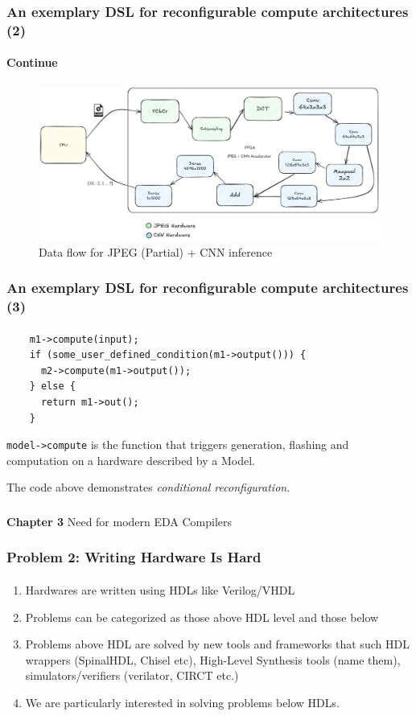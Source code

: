 \documentclass{beamer}
\begin{document}
{\begin{frame}[fragile]
  \frametitle{An exemplary DSL for reconfigurable compute architectures (2)}
\framesubtitle{Continue}
   \begin{figure}
        \centering
        \includegraphics[width=1\linewidth]{flowcnnjpeg.png}
        \caption{Data flow for JPEG (Partial) + CNN inference}
    \end{figure}
\end{frame}

\begin{frame}[fragile]
  \frametitle{An exemplary DSL for reconfigurable compute architectures (3)}
\framesubtitle{}
  \begin{verbatim}
    m1->compute(input);
    if (some_user_defined_condition(m1->output())) {
      m2->compute(m1->output());
    } else {
      return m1->out();
    }
\end{verbatim}
  \texttt{model->compute} is the function that triggers generation, flashing and
  computation on a hardware described by a Model.

  The code above demonstrates \textit{conditional reconfiguration}.
\end{frame}

\begin{frame}[c,fragile]
  \frametitle{}

  \centering
  \textbf{Chapter 3} 
  \centering
  Need for modern EDA Compilers
\end{frame}

\newcommand\myheading[1]{%
  \par\bigskip
  {\Large\bfseries#1}\par\smallskip}

 
\begin{frame}[fragile]
  \frametitle{Problem 2: Writing Hardware Is Hard}
  \framesubtitle{}
  \begin{enumerate}
    \item Hardwares are written using HDLs like Verilog/VHDL
    \item Problems can be categorized as those above HDL level and those below
    \item Problems above HDL are solved by new tools and frameworks that
      such HDL wrappers (SpinalHDL, Chisel etc), High-Level Synthesis tools
      (name them), simulators/verifiers (verilator, CIRCT etc.)
    \item We are particularly interested in solving problems below HDLs.


\end{enumerate}
\end{frame}}
\end{document}
